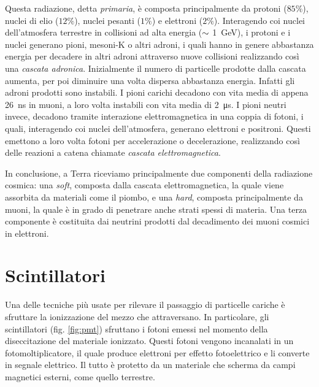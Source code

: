 \documentclass[../main.tex]{subfiles}
\begin{document}
Questa radiazione, detta \textit{primaria}, è composta principalmente da protoni ($85\%$), nuclei di elio ($12\%$), nuclei pesanti ($1\%$) e elettroni ($2\%$). Interagendo coi nuclei dell'atmosfera terrestre in collisioni ad alta energia ($\small \sim$ \SI{1}{\GeV}), i protoni e i nuclei generano pioni, mesoni-K o altri adroni, i quali hanno in genere abbastanza energia per decadere in altri adroni attraverso nuove collisioni realizzando così una \textit{cascata adronica}. Inizialmente il numero di particelle prodotte dalla cascata aumenta, per poi diminuire una volta dispersa abbastanza energia. Infatti gli adroni prodotti sono instabili. I pioni carichi decadono con vita media di appena \SI{26}{\ns} in muoni, a loro volta instabili con vita media di \SI{2}{\micro\s}. I pioni neutri invece, decadono tramite interazione elettromagnetica in una coppia di fotoni, i quali, interagendo coi nuclei dell'atmosfera, generano elettroni e positroni. Questi emettono a loro volta fotoni per accelerazione o decelerazione, realizzando così delle reazioni a catena chiamate \textit{cascata elettromagnetica}.

In conclusione, a Terra riceviamo principalmente due componenti della radiazione cosmica: una \textit{soft}, composta dalla cascata elettromagnetica, la quale viene assorbita da materiali come il piombo, e una \textit{hard}, composta principalmente da muoni, la quale è in grado di penetrare anche strati spessi di materia. 
Una terza componente è costituita dai neutrini prodotti dal decadimento dei muoni cosmici in elettroni.

\section{Scintillatori}
Una delle tecniche più usate per rilevare il passaggio di particelle cariche è sfruttare la ionizzazione del mezzo che attraversano. In particolare, gli scintillatori (fig. \ref{fig:pmt}) sfruttano i fotoni emessi nel momento della diseccitazione del materiale ionizzato. Questi fotoni vengono incanalati in un fotomoltiplicatore, il quale produce elettroni per effetto fotoelettrico e li converte in segnale elettrico. Il tutto è protetto da un materiale che scherma da campi magnetici esterni, come quello terrestre.
\end{document}
